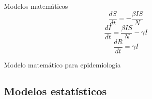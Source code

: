 \documentclass{beamer}
\begin{document}
\begin{frame}{Modelos matemáticos}
  \centering
  \begin{displaymath}
    \frac{dS}{dt} = -\frac{\beta I S}{N}
  \end{displaymath}
  \begin{displaymath}
    \frac{dI}{dt} = \frac{\beta I S}{N} - \gamma I
  \end{displaymath}
  \begin{displaymath}
    \frac{dR}{dt} = \gamma I
  \end{displaymath}

\bigskip
Modelo matemático para epidemiologia
\end{frame}

\subsection{Modelos estatísticos}
\end{document}
